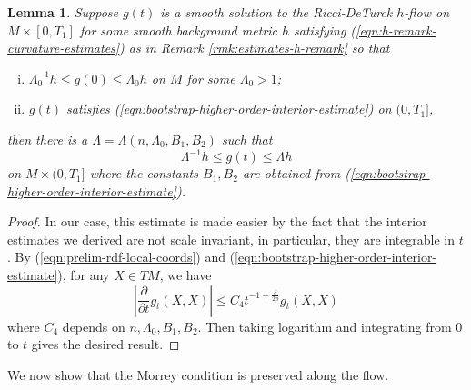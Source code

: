 \documentclass[12pt]{amsart}
\theoremstyle{plain}
\theoremstyle{plain}
\newtheorem{lemma}[subsection]{Lemma}
\theoremstyle{definition}
\theoremstyle{remark}
\numberwithin{equation}{subsection}
\begin{document}
\begin{lemma}\label{lem:Linfty-preservation}
    Suppose $g(t)$ is a smooth solution to the Ricci-DeTurck $h$-flow on $M \times [0,T_1]$ for some smooth background metric $h$ satisfying (\ref{eqn:h-remark-curvature-estimates}) as in Remark \ref{rmk:estimates-h-remark} so that
    \begin{enumerate}[(i)]
        \item $\Lambda_0^{-1}h \leq g(0) \leq \Lambda_0 h$ on $M$ for some $\Lambda_0 > 1$;
        \item $g(t)$ satisfies (\ref{eqn:bootstrap-higher-order-interior-estimate}) on $(0, T_1]$,
    \end{enumerate}
    then there is a $\Lambda = \Lambda(n, \Lambda_0,B_1,B_2)$ such that
    \begin{equation*}
        \Lambda^{-1}h \leq g(t) \leq \Lambda h
    \end{equation*}
    on $M \times (0,T_1]$ where the constants $B_1,B_2$ are obtained from (\ref{eqn:bootstrap-higher-order-interior-estimate}).
\end{lemma}

\begin{proof}
    In our case, this estimate is made easier by the fact that the interior estimates we derived are not scale invariant, in particular, they are integrable in $t$. By (\ref{eqn:prelim-rdf-local-coords}) and (\ref{eqn:bootstrap-higher-order-interior-estimate}), for any $X \in TM$, we have
    \begin{equation*}
        \left|\frac{\partial}{\partial t} g_t(X,X)\right| \leq C_4t^{-1+\frac{\delta}{2p}}g_t(X,X)
    \end{equation*}
    where $C_4$ depends on $n, \Lambda_0, B_1, B_2$. Then taking logarithm and integrating from 0 to $t$ gives the desired result.
\end{proof}

We now show that the Morrey condition is preserved along the flow.
\end{document}
